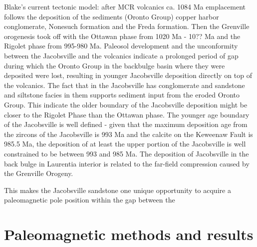 \documentclass[draft]{agujournal2019}
\begin{document}
Blake's current tectonic model: after MCR volcanics ca. 1084 Ma emplacement follows the deposition of the sediments (Oronto Group) copper harbor conglomerate, Nonesuch formation and the Freda formation. Then the Grenville orogenesis took off with the Ottawan phase from 1020 Ma - 10?? Ma and the Rigolet phase from 995-980 Ma. Paleosol development and the unconformity between the Jacobsville and the volcanics indicate a prolonged period of gap during which the Oronto Group in the backbulge basin where they were deposited were lost, resulting in younger Jacobsville deposition directly on top of the volcanics. The fact that in the Jacobsville has conglomerate and sandstone and siltstone facies in them supports sediment input from the eroded Oronto Group. This indicate the older boundary of the Jacobsville deposition might be closer to the Rigolet Phase than the Ottawan phase. The younger age boundary of the Jacobsville is well defined - given that the maximum deposition age from the zircons of the Jacobsville is 993 Ma and the calcite on the Keweenaw Fault is 985.5 Ma, the deposition of at least the upper portion of the Jacobsville is well constrained to be between 993 and 985 Ma. The deposition of Jacobsville in the back bulge in Laurentia interior is related to the far-field compression caused by the Grenville Orogeny. 

This makes the Jacobsville sandstone one unique opportunity to acquire a paleomagnetic pole position within the gap between the 



\section*{Paleomagnetic methods and results}
\end{document}
